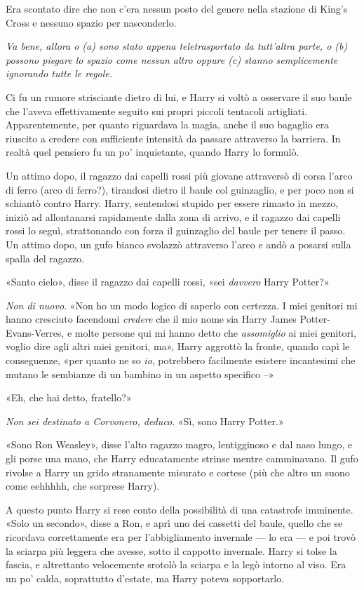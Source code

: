 Era scontato dire che non c’era nessun posto del genere nella stazione di King’s Cross e nessuno spazio per nasconderlo.

\textit{Va bene, allora o (a) sono stato appena teletrasportato da tutt’altra parte, o (b) possono piegare lo spazio come nessun altro oppure (c) stanno semplicemente ignorando tutte le regole.}

Ci fu un rumore strisciante dietro di lui, e Harry si voltò a osservare il suo baule che l’aveva effettivamente seguito sui propri piccoli tentacoli artigliati. Apparentemente, per quanto riguardava la magia, anche il suo bagaglio era riuscito a credere con sufficiente intensità da passare attraverso la barriera. In realtà quel pensiero fu un po’ inquietante, quando Harry lo formulò.

Un attimo dopo, il ragazzo dai capelli rossi più giovane attraversò di corsa l’arco di ferro (arco di ferro?), tirandosi dietro il baule col guinzaglio, e per poco non si schiantò contro Harry. Harry, sentendosi stupido per essere rimasto in mezzo, iniziò ad allontanarsi rapidamente dalla zona di arrivo, e il ragazzo dai capelli rossi lo seguì, strattonando con forza il guinzaglio del baule per tenere il passo. Un attimo dopo, un gufo bianco svolazzò attraverso l’arco e andò a posarsi sulla spalla del ragazzo.

«Santo cielo», disse il ragazzo dai capelli rossi, «sei \textit{davvero} Harry Potter?»

\textit{Non di nuovo}. «Non ho un modo logico di saperlo con certezza. I miei genitori mi hanno cresciuto facendomi \textit{credere} che il mio nome sia Harry James Potter-Evans-Verres, e molte persone qui mi hanno detto che \textit{assomiglio} ai miei genitori, voglio dire agli altri miei genitori, ma», Harry aggrottò la fronte, quando capì le conseguenze, «per quanto ne so \textit{io}, potrebbero facilmente esistere incantesimi che mutano le sembianze di un bambino in un aspetto specifico –»

«Eh, che hai detto, fratello?»

\textit{Non sei destinato a Corvonero, deduco}. «Sì, sono Harry Potter.»

«Sono Ron Weasley», disse l’alto ragazzo magro, lentigginoso e dal naso lungo, e gli porse una mano, che Harry educatamente strinse mentre camminavano. Il gufo rivolse a Harry un grido stranamente misurato e cortese (più che altro un suono come eehhhhh, che sorprese Harry).

A questo punto Harry si rese conto della possibilità di una catastrofe imminente. «Solo un secondo», disse a Ron, e aprì uno dei cassetti del baule, quello che se ricordava correttamente era per l’abbigliamento invernale — lo era — e poi trovò la sciarpa più leggera che avesse, sotto il cappotto invernale. Harry si tolse la fascia, e altrettanto velocemente srotolò la sciarpa e la legò intorno al viso. Era un po’ calda, soprattutto d’estate, ma Harry poteva sopportarlo.

